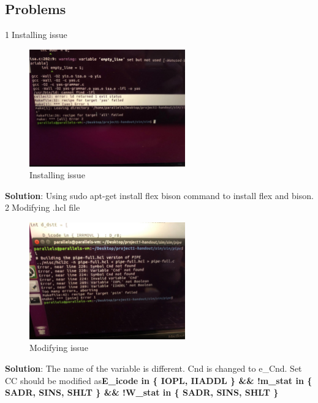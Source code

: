 \documentclass{article}
\begin{document}
\subsection{Problems}

\textcircled{1}Installing issue\\
\begin{figure}[H]
	\begin{minipage}[h]{\textwidth}
		\centering
		\includegraphics[width=0.6\textwidth]{problem1.jpg}
		\caption{Installing issue} \label{Fig-G14}
	\end{minipage}
\end{figure}
\textbf{Solution}: Using sudo apt-get install flex bison command to install flex and bison.\\
\textcircled{2}Modifying .hcl file\\
\begin{figure}[H]
	\begin{minipage}[h]{\textwidth}
		\centering
		\includegraphics[width=0.6\textwidth]{problem2.jpg}
		\caption{Modifying issue} \label{Fig-G15}
	\end{minipage}
\end{figure}
\textbf{Solution}: The name of the variable is different. Cnd is changed to e\_Cnd. Set CC should be modified as\textbf{E\_icode in \{ IOPL, IIADDL \} \&\& !m\_stat in \{ SADR, SINS, SHLT \} \&\& !W\_stat in \{ SADR, SINS, SHLT \}}\\
\end{document}
